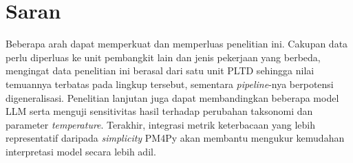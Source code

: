 \section{Saran}

Beberapa arah dapat memperkuat dan memperluas penelitian ini. Cakupan data perlu diperluas ke unit pembangkit lain dan jenis pekerjaan yang berbeda, mengingat data penelitian ini berasal dari satu unit PLTD sehingga nilai temuannya terbatas pada lingkup tersebut, sementara \textit{pipeline}-nya berpotensi digeneralisasi. Penelitian lanjutan juga dapat membandingkan beberapa model LLM serta menguji sensitivitas hasil terhadap perubahan taksonomi dan parameter \textit{temperature}. Terakhir, integrasi metrik keterbacaan yang lebih representatif daripada \textit{simplicity} PM4Py akan membantu mengukur kemudahan interpretasi model secara lebih adil.
